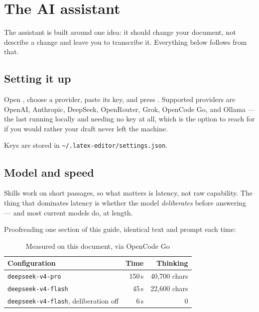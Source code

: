\section{The AI assistant}
\label{sec:ai}

The assistant is built around one idea: it should change your document, not
describe a change and leave you to transcribe it. Everything below follows from
that.

\subsection{Setting it up}

Open , choose a provider, paste its key, and press
. Supported providers are OpenAI, Anthropic, DeepSeek,
OpenRouter, Grok, OpenCode Go, and Ollama --- the last running locally and
needing no key at all, which is the option to reach for if you would rather
your draft never left the machine.

Keys are stored in \texttt{\textasciitilde/.latex-editor/settings.json}.

\subsection{Model and speed}
\label{sec:ai-model}

Skills work on short passages, so what matters is latency, not raw capability.
The thing that dominates latency is whether the model \emph{deliberates} before
answering --- and most current models do, at length.

Proofreading one section of this guide, identical text and prompt each time:

\begin{table}[htbp]
  \centering
  \caption{Measured on this document, via OpenCode Go}
  \label{tab:models}
  \begin{tabular}{lrr}
    \toprule
    \textbf{Configuration} & \textbf{Time} & \textbf{Thinking} \\
    \midrule
    \texttt{deepseek-v4-pro}                        & 150\,s & 40{,}700 chars \\
    \texttt{deepseek-v4-flash}                      & 45\,s  & 22{,}600 chars \\
    \texttt{deepseek-v4-flash}, deliberation off    & 6\,s   & 0 \\
    \bottomrule
  \end{tabular}
\end{table}

